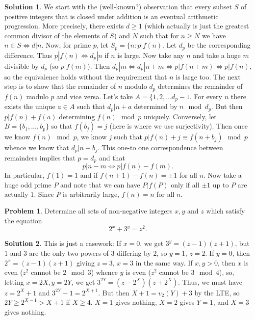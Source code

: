 \documentclass{article}
\theoremstyle{definition}
\newtheorem{problem}{Problem}
\newtheorem*{solution}{Solution}
\begin{document}
\begin{solution}
We start with the (well-known?) observation that every subset $S$ of positive integers that is closed under addition is an eventual arithmetic progression. More precisely, there exists $d\ge 1$ (which actually is just the greatest common divisor of the elements of $S$) and $N$ such that for $n\ge N$ we have $n\in S\Longleftrightarrow d|n$.
Now, for prime $p$, let ${S_p=\{n:p|f(n)}$. Let $d_p$ be the corresponding difference. Thus $p|f(n)\Longleftrightarrow d_p|n$ if $n$ is large. Now take any $n$ and take a huge $m$ divisible by $d_p$ (so $p|f(m)$). Then $d_p|m \Longleftrightarrow d_p|n+m\Longleftrightarrow p|f(n+m)\Longleftrightarrow p|f(n)$, so the equivalence holds without the requirement that $n$ is large too.
The next step is to show that the remainder of $n$ modulo $d_p$ determines the remainder of $f(n)$ modulo $p$ and vice versa. Let's take ${A=\{1,2,\dots d_p-1}$. For every $n$ there exists the unique $a\in A$ such that $d_p|n+a$ determined by $n\mod d_p$. But then $p|f(n)+f(a)$ determining $f(n)\mod p$ uniquely. Conversely, let $B=\{b_1,\dots,b_p\}$ so that $f(b_j)=j$ (here is where we use surjectivity). Then once we know $f(n)\mod p$, we know $j$ such that $p|f(n)+j\equiv f(n+b_j)\mod p$ whence we know that $d_p|n+b_j$. This one-to one correspondence between remainders implies that $p=d_p$ and that $$p|n-m\Longleftrightarrow p|f(n)-f(m).$$
In particular, $f(1)=1$ and if $f(n+1)-f(n)=\pm 1$ for all $n$.
Now take a huge odd prime $P$ and note that we can have $P|f(P)$ only if all $\pm 1$ up to $P$ are actually $1$. Since $P$ is arbitrarily large, $f(n)=n$ for all $n$.
\end{solution}

\begin{problem}
Determine all sets of non-negative integers $ x, y$ and $ z$ which satisfy the equation $$2^{x}+3^{y}=z^{2}.$$
\end{problem}

\begin{solution}
This is just a casework:
If $x=0$, we get $3^y=(z-1)(z+1)$, but $1$ and $3$ are the only two powers of $3$ differing by $2$, so $y=1$, $z=2$.
If $y=0$, then $2^x=(z-1)(z+1)$ giving $z=3$, $x=3$ in the same way.
If $x,y>0$, then $x$ is even ($z^2$ cannot be $2\mod 3$) whence $y$ is even ($z^2$ cannot be $3\mod 4$), so, letting $x=2X,y=2Y$, we get $3^{2Y}=(z-2^X)(z+2^X)$. Thus, we must have $z=2^X+1$ and $3^{2Y}-1=2^{X+1}$. But then $X+1=v_2(Y)+3$ by the LTE, so $2Y\ge 2^{X-1}>X+1$ if $X\ge 4$. $X=1$ gives nothing, $X=2$ gives $Y=1$, and $X=3$ gives nothing.
\end{solution}
\end{document}

